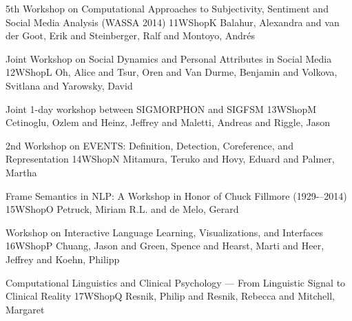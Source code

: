 \begin{wsschedule}
  {5th Workshop on Computational Approaches to Subjectivity, Sentiment and Social Media Analysis (WASSA 2014)}
  {11}{WShopK}
  {Balahur, Alexandra and van der Goot, Erik and Steinberger, Ralf and Montoyo, Andrés}
  {\WShopLocK}
  
\end{wsschedule}
\begin{wsschedule}
  {Joint Workshop on Social Dynamics and Personal Attributes in Social Media}
  {12}{WShopL}
  {Oh, Alice and Tsur, Oren and Van Durme, Benjamin and Volkova, Svitlana and Yarowsky, David}
  {\WShopLocL}
  
\end{wsschedule}
\begin{wsschedule}
  {Joint 1-day workshop between SIGMORPHON and SIGFSM}
  {13}{WShopM}
  {Cetinoglu, Ozlem and Heinz, Jeffrey and Maletti, Andreas and Riggle, Jason}
  {\WShopLocM}
  
\end{wsschedule}
\begin{wsschedule}
  {2nd Workshop on EVENTS: Definition, Detection, Coreference, and Representation}
  {14}{WShopN}
  {Mitamura, Teruko and Hovy, Eduard and Palmer, Martha}
  {\WShopLocN}
  
\end{wsschedule}
\begin{wsschedule}
  {Frame Semantics in NLP: A Workshop in Honor of Chuck Fillmore (1929-–2014)}
  {15}{WShopO}
  {Petruck, Miriam R.L. and de Melo, Gerard}
  {\WShopLocO}
  
\end{wsschedule}
\begin{wsschedule}
  {Workshop on Interactive Language Learning, Visualizations, and Interfaces}
  {16}{WShopP}
  {Chuang, Jason and Green, Spence and Hearst, Marti and Heer, Jeffrey and Koehn, Philipp}
  {\WShopLocP}
  
\end{wsschedule}
\begin{wsschedule}
  {Computational Linguistics and Clinical Psychology --- From Linguistic Signal to Clinical Reality}
  {17}{WShopQ}
  {Resnik, Philip and Resnik, Rebecca and Mitchell, Margaret}
  {\WShopLocQ}
  
\end{wsschedule}

\clearpage{\thispagestyle{emptyheader}\cleardoublepage}
